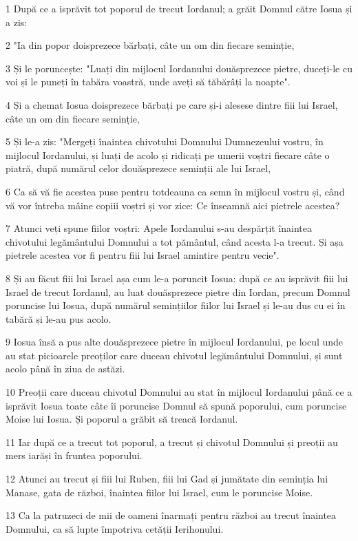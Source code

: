 \par 1 După ce a isprăvit tot poporul de trecut Iordanul; a grăit Domnul către Iosua și a zis:
\par 2 "Ia din popor doisprezece bărbați, câte un om din fiecare seminție,
\par 3 Și le poruncește: "Luați din mijlocul Iordanului douăsprezece pietre, duceți-le cu voi și le puneți în tabăra voastră, unde aveți să tăbărâți la noapte".
\par 4 Și a chemat Iosua doisprezece bărbați pe care și-i alesese dintre fiii lui Israel, câte un om din fiecare seminție,
\par 5 Și le-a zis: "Mergeți înaintea chivotului Domnului Dumnezeului vostru, în mijlocul Iordanului, și luați de acolo și ridicați pe umerii voștri fiecare câte o piatră, după numărul celor douăsprezece seminții ale lui Israel,
\par 6 Ca să vă fie acestea puse pentru totdeauna ca semn în mijlocul vostru și, când vă vor întreba mâine copiii voștri și vor zice: Ce înseamnă aici pietrele acestea?
\par 7 Atunci veți spune fiilor voștri: Apele Iordanului s-au despărțit înaintea chivotului legământului Domnului a tot pământul, când acesta l-a trecut. Și așa pietrele acestea vor fi pentru fiii lui Israel amintire pentru vecie".
\par 8 Și au făcut fiii lui Israel așa cum le-a poruncit Iosua: după ce au isprăvit fiii lui Israel de trecut Iordanul, au luat douăsprezece pietre din Iordan, precum Domnul poruncise lui Iosua, după numărul semințiilor fiilor lui Israel și le-au dus cu ei în tabără și le-au pus acolo.
\par 9 Iosua însă a pus alte douăsprezece pietre în mijlocul Iordanului, pe locul unde au stat picioarele preoților care duceau chivotul legământului Domnului, și sunt acolo până în ziua de astăzi.
\par 10 Preoții care duceau chivotul Domnului au stat în mijlocul Iordanului până ce a isprăvit Iosua toate câte îi poruncise Domnul să spună poporului, cum poruncise Moise lui Iosua. Și poporul a grăbit să treacă Iordanul.
\par 11 Iar după ce a trecut tot poporul, a trecut și chivotul Domnului și preoții au mers iarăși în fruntea poporului.
\par 12 Atunci au trecut și fiii lui Ruben, fiii lui Gad și jumătate din seminția lui Manase, gata de război, înaintea fiilor lui Israel, cum le poruncise Moise.
\par 13 Ca la patruzeci de mii de oameni înarmați pentru război au trecut înaintea Domnului, ca să lupte împotriva cetății Ierihonului.
